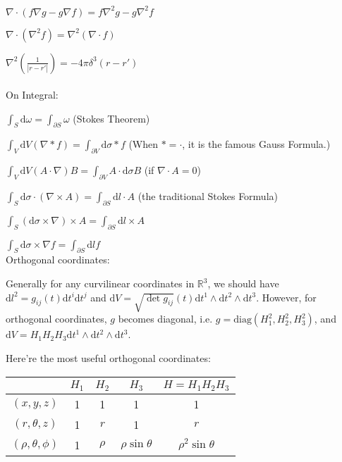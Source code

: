 \documentclass[10pt]{article}
\begin{document}
$\nabla \cdot (f\nabla g-g\nabla f)=f\nabla^2 g-g\nabla^2 f$

$\nabla \cdot (\nabla^2 f)=\nabla^2(\nabla \cdot f)$

$\displaystyle{\nabla^2\left(\frac{1}{|r-r'|} \right) =-4\pi \delta^3(r-r')}$\\
\\
On Integral:

$\displaystyle{\int_S \mathrm{d}\omega=\int_{\partial S}\omega}$  (Stokes Theorem)

$\displaystyle{\int_V \mathrm{d}V(\nabla*f)=\int_{\partial V}\mathrm{d}\sigma *f }$  (When $*=\cdot$, it is the famous Gauss Formula.)

$\displaystyle{\int_V \mathrm{d}V(A\cdot \nabla)B =\int_{\partial V}A\cdot\mathrm{d}\sigma}B$   (if $\nabla \cdot A=0$)

$\displaystyle{\int_S \mathrm{d}\sigma \cdot (\nabla \times A)=\int_{\partial S}\mathrm{d}l\cdot A }$  (the traditional Stokes Formula)

$\displaystyle{\int_S (\mathrm{d}\sigma \times \nabla)\times A=\int_{\partial S}\mathrm{d}l \times A}$

$\displaystyle{\int_S \mathrm{d}\sigma \times \nabla f=\int_{\partial S}\mathrm{d}l f }$\\

\noindent Orthogonal coordinates:

Generally for any curvilinear coordinates in $\mathbb{R}^3$, we should have $\mathrm{d}l^2=g_{ij}(t)\mathrm{d}t^i\mathrm{d}t^j$ and 
$\mathrm{d}V=\sqrt{\det g_{ij}}(t)\mathrm{d}t^1 \wedge \mathrm{d}t^2\wedge \mathrm{d}t^3$. However, for orthogonal coordinates, $g$ becomes diagonal, i.e.  $g=\mathrm{diag}(H_1^2,H^2_2,H^2_3)$, and $\mathrm{d}V=H_1H_2H_3\mathrm{d}t^1 \wedge \mathrm{d}t^2\wedge \mathrm{d}t^3$.

Here're the most useful orthogonal coordinates:
\begin{table}[!hbp]
\centering
\begin{tabular}{|c|c|c|c|c|}
\hline
 &$H_1$ & $H_2$ & $H_3$&$H=H_1H_2H_3$\\
\hline
$(x,y,z)$ & 1 & 1 & 1 &1\\
\hline
$(r,\theta,z)$ & 1 & $r$ & 1 &$r$\\
\hline
$(\rho,\theta,\phi)$ &1 & $\rho$ & $\rho \sin \theta$ &$\rho^2 \sin \theta$ \\
\hline
\end{tabular}
\end{table}
\end{document}
